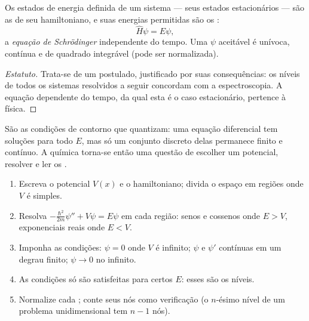 \begin{theorem}\label{thm:b3:quantum-model-systems:schrodinger}
Os estados de energia definida de um sistema --- seus estados estacionários ---
são as  de seu hamiltoniano, e suas energias permitidas são os
:
\[
\hat H\psi = E\psi,
\]
a \emph{equação de Schrödinger} independente do tempo.
Uma $\psi$ aceitável é unívoca, contínua e de quadrado integrável
(pode ser normalizada).
\end{theorem}
\begin{proof}[Estatuto]
Trata-se de um postulado, justificado por suas consequências: os níveis de
todos os sistemas resolvidos a seguir concordam com a espectroscopia. A
equação dependente do tempo, da qual esta é o caso estacionário, pertence à física.
\end{proof}

São as condições de contorno que quantizam: uma equação diferencial tem
soluções para todo $E$, mas só um conjunto discreto delas permanece finito
e contínuo. A química torna-se então uma questão de escolher um potencial,
resolver e ler os .

\begin{method}\label{met:b3:quantum-model-systems:one-dimensional}
\begin{enumerate}
  \item Escreva o potencial $V(x)$ e o hamiltoniano; divida o espaço em
        regiões onde $V$ é simples.
  \item Resolva $-\frac{\hbar^2}{2m}\psi'' + V\psi = E\psi$ em cada região: senos
        e cossenos onde $E > V$, exponenciais reais onde $E < V$.
  \item Imponha as condições: $\psi = 0$ onde $V$ é infinito; $\psi$
        e $\psi'$ contínuas em um degrau finito; $\psi \to 0$ no infinito.
  \item As condições só são satisfeitas para certos $E$: esses são os níveis.
  \item Normalize cada ; conte seus nós como verificação (o
        $n$-ésimo nível de um problema unidimensional tem $n - 1$ nós).
\end{enumerate}
\end{method}


